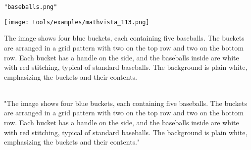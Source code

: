\begin{textcolorbox}
 \texttt{"baseballs.png"}

\vspace{0.2cm}
\texttt{[image: tools/examples/mathvista\_113.png]}
\vspace{0.2cm}


The image shows four blue buckets, each containing five baseballs. The buckets are arranged in a grid pattern with two on the top row and two on the bottom row. Each bucket has a handle on the side, and the baseballs inside are white with red stitching, typical of standard baseballs. The background is plain white, emphasizing the buckets and their contents.
\\\\
\begin{codebox}
{
    "The image shows four blue buckets, each containing five baseballs. The buckets are arranged in a grid pattern with two on the top row and two on the bottom row. Each bucket has a handle on the side, and the baseballs inside are white with red stitching, typical of standard baseballs. The background is plain white, emphasizing the buckets and their contents."
}
\end{codebox}

\end{textcolorbox}